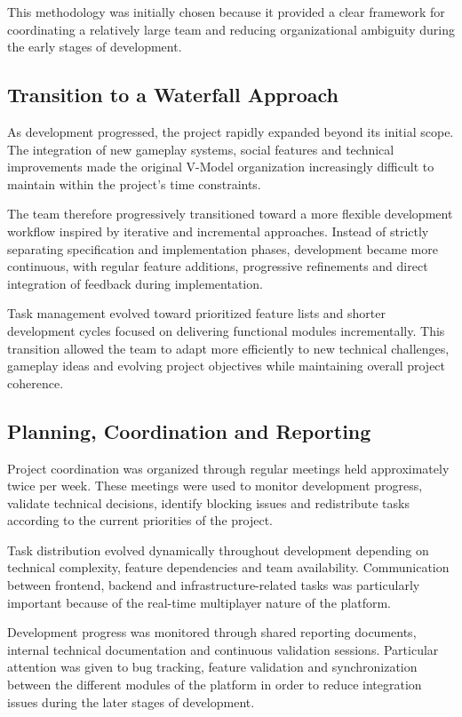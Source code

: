 \documentclass[11pt,a4paper]{article}
\begin{document}
This methodology was initially chosen because it provided a clear framework for coordinating a relatively large team and reducing organizational ambiguity during the early stages of development.

\subsection{Transition to a Waterfall Approach}

As development progressed, the project rapidly expanded beyond its initial scope. The integration of new gameplay systems, social features and technical improvements made the original V-Model organization increasingly difficult to maintain within the project's time constraints.

The team therefore progressively transitioned toward a more flexible development workflow inspired by iterative and incremental approaches. Instead of strictly separating specification and implementation phases, development became more continuous, with regular feature additions, progressive refinements and direct integration of feedback during implementation.

Task management evolved toward prioritized feature lists and shorter development cycles focused on delivering functional modules incrementally. This transition allowed the team to adapt more efficiently to new technical challenges, gameplay ideas and evolving project objectives while maintaining overall project coherence.

\subsection{Planning, Coordination and Reporting}

Project coordination was organized through regular meetings held approximately twice per week. These meetings were used to monitor development progress, validate technical decisions, identify blocking issues and redistribute tasks according to the current priorities of the project.

Task distribution evolved dynamically throughout development depending on technical complexity, feature dependencies and team availability. Communication between frontend, backend and infrastructure-related tasks was particularly important because of the real-time multiplayer nature of the platform.

Development progress was monitored through shared reporting documents, internal technical documentation and continuous validation sessions. Particular attention was given to bug tracking, feature validation and synchronization between the different modules of the platform in order to reduce integration issues during the later stages of development.
\end{document}
